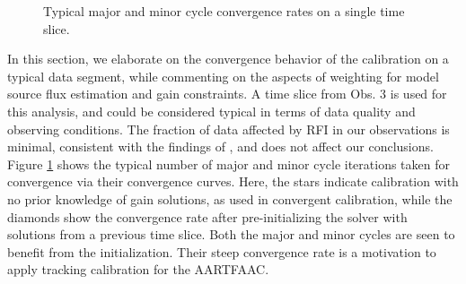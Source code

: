 \documentclass[referee]{aa}
\begin{document}
\begin{figure}[tbh]

\caption{\label{fig:Convergence-behaviour-of}Typical   major  and   minor  cycle
  convergence rates on  a single time slice.}
\end{figure}

In this section, we elaborate on the convergence behavior of the calibration on
a typical data  segment, while commenting on the aspects  of weighting for model
source flux estimation  and gain constraints.  A time slice from  Obs.  3 is used
for this analysis, and could be  considered typical in terms of data quality and
observing conditions.  The fraction of  data affected by RFI in our observations
is minimal, consistent with  the findings of \citep{offringa2013lofar}, and does
not affect our conclusions.  Figure \ref{fig:Convergence-behaviour-of} shows the
typical number  of major  and minor cycle  iterations taken for  convergence via
their convergence  curves. Here,  the stars indicate  calibration with  no prior
knowledge  of gain  solutions,  as  used in  convergent  calibration, while  the
diamonds  show  the convergence  rate  after  pre-initializing  the solver  with
solutions from a  previous time slice.  Both the major and  minor cycles are seen
to  benefit  from  the  initialization.  Their  steep  convergence  rate  is  a
motivation to apply tracking calibration for the AARTFAAC.
\end{document}
